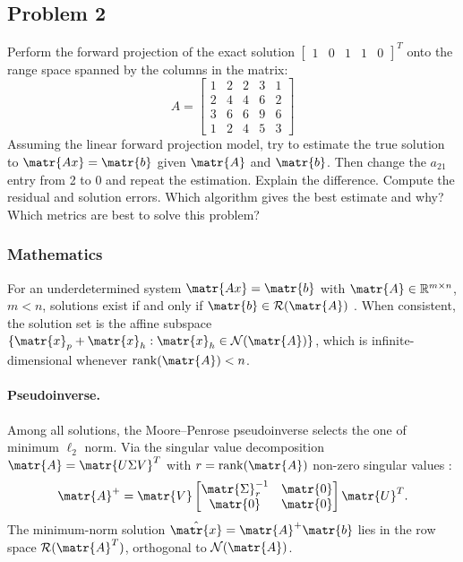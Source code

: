 \subsection{Problem 2}%
\label{sec:problem_2}
Perform the forward projection of the exact solution
$\begin{bmatrix} 1 & 0 & 1 & 1 & 0 \end{bmatrix}^T$
onto the range space spanned by the columns in the matrix:
\begin{equation*}
    A = \begin{bmatrix}
        1 & 2 & 2 & 3 & 1 \\
        2 & 4 & 4 & 6 & 2 \\
        3 & 6 & 6 & 9 & 6 \\
        1 & 2 & 4 & 5 & 3
\end{bmatrix}
\end{equation*}
Assuming the linear forward projection model, try to estimate the true solution to
$\matr{Ax} = \matr{b}$ given $\matr{A}$ and $\matr{b}$.
Then change the $a_{21}$ entry from 2 to 0 and repeat the estimation.
Explain the difference.
Compute the residual and solution errors.
Which algorithm gives the best estimate and why?
Which metrics are best to solve this problem?
\subsubsection*{Mathematics}
For an underdetermined system $\matr{Ax}=\matr{b}$ with
$\matr{A}\in\mathbb{R}^{m\times n}$, $m < n$, solutions exist if and only if
$\matr{b}\in\mathcal{R}(\matr{A})$ \citep{Meyer}.
When consistent, the solution set is the affine subspace
$\{\matr{x}_p + \matr{x}_h : \matr{x}_h \in \mathcal{N}(\matr{A})\}$,
which is infinite-dimensional whenever $\operatorname{rank}(\matr{A}) < n$.

\paragraph{Pseudoinverse.}
Among all solutions, the Moore--Penrose pseudoinverse selects the one of minimum
$\ell_2$ norm.
Via the singular value decomposition $\matr{A} = \matr{U\Sigma V}^T$ with
$r = \operatorname{rank}(\matr{A})$ non-zero singular values \citep{GoluVanl96}:
\begin{equation*}
  \matr{A}^+ = \matr{V}
  \begin{bmatrix} \matr{\Sigma}_r^{-1} & \matr{0} \\ \matr{0} & \matr{0} \end{bmatrix}
  \matr{U}^T.
\end{equation*}
The minimum-norm solution $\hat{\matr{x}} = \matr{A}^+\matr{b}$ lies in the row
space $\mathcal{R}(\matr{A}^T)$, orthogonal to $\mathcal{N}(\matr{A})$.

